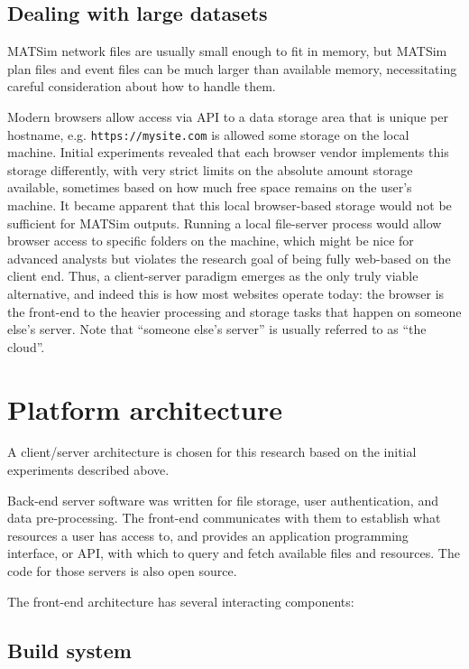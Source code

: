 \hypertarget{dealing-with-large-datasets}{%
\subsection{Dealing with large datasets}\label{dealing-with-large-datasets}}

MATSim network files are usually small enough to fit in memory, but MATSim plan files and event files can be much larger than available memory, necessitating careful consideration about how to handle them.

Modern browsers allow access via API to a data storage area that is unique per hostname, e.g. \texttt{https://mysite.com} is allowed some storage on the local machine. Initial experiments revealed that each browser vendor implements this storage differently, with very strict limits on the absolute amount storage available, sometimes based on how much free space remains on the user's machine. It became apparent that this local browser-based storage would not be sufficient for MATSim outputs. Running a local file-server process would allow browser access to specific folders on the machine, which might be nice for advanced analysts but violates the research goal of being fully web-based on the client end. Thus, a client-server paradigm emerges as the only truly viable alternative, and indeed this is how most websites operate today: the browser is the front-end to the heavier processing and storage tasks that happen on someone else's server. Note that ``someone else's server'' is usually referred to as ``the cloud''.

\hypertarget{mathub-platform-architecture}{%
\section{Platform architecture}\label{platform-architecture}}

A client/server architecture is chosen for this research based on the initial experiments described above.

Back-end server software was written for file storage, user authentication, and data pre-processing. The front-end communicates with them to establish what resources a user has access to, and provides an application programming interface, or API, with which to query and fetch available files and resources. The code for those servers is also open source.

The front-end architecture has several interacting components:

\hypertarget{mathub-build-system}{%
\subsection{Build system}\label{build-system}}

